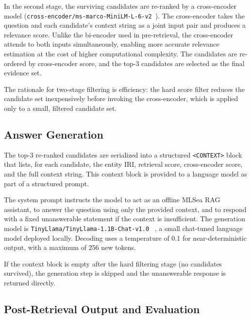 In the second stage, the surviving candidates are re-ranked by a cross-encoder
model (\texttt{cross-encoder/ms-marco-MiniLM-L-6-v2}~).
The cross-encoder takes the question and each candidate's context string as a
joint input pair and produces a relevance score.
Unlike the bi-encoder used in pre-retrieval, the cross-encoder attends to both
inputs simultaneously, enabling more accurate relevance estimation at the cost
of higher computational complexity.
The candidates are re-ordered by cross-encoder score, and the top-3 candidates
are selected as the final evidence set.

The rationale for two-stage filtering is efficiency: the hard score filter
reduces the candidate set inexpensively before invoking the cross-encoder,
which is applied only to a small, filtered candidate set.

\subsection{Answer Generation}
\label{subsec:generation}

The top-3 re-ranked candidates are serialized into a structured
\texttt{<CONTEXT>} block that lists, for each candidate, the entity IRI,
retrieval score, cross-encoder score, and the full context string.
This context block is provided to a language model as part of a structured
prompt.

The system prompt instructs the model to act as an offline MLSea RAG
assistant, to answer the question using only the provided context, and to
respond with a fixed unanswerable statement if the context is insufficient.
The generation model is \texttt{TinyLlama/TinyLlama-1.1B-Chat-v1.0}
~, a small chat-tuned language model deployed locally.
Decoding uses a temperature of 0.1 for near-deterministic output, with a
maximum of 256 new tokens.

If the context block is empty after the hard filtering stage (no candidates
survived), the generation step is skipped and the unanswerable response is
returned directly.

\subsection{Post-Retrieval Output and Evaluation}
\label{subsec:postretrieval_output}

